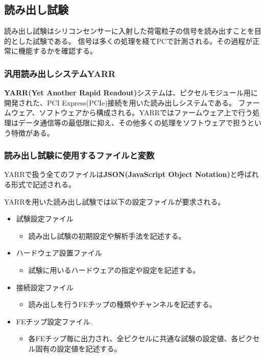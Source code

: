 \clearpage
\subsection{読み出し試験}
読み出し試験はシリコンセンサーに入射した荷電粒子の信号を読み出すことを目的とした試験である。
信号は多くの処理を経てPCで計測される。その過程が正常に機能するかを確認する。

\subsubsection{汎用読み出しシステムYARR}
\textbf{YARR(Yet Another Rapid Readout)}システム\cite{3-3}は、ピクセルモジュール用に開発された、PCI Express(PCIe)接続を用いた読み出しシステムである。
ファームウェア、ソフトウェアから構成される。YARRではファームウェア上で行う処理はデータ通信等の最低限に抑え、その他多くの処理をソフトウェアで担うという特徴がある。

\subsubsection{読み出し試験に使用するファイルと変数}
YARRで扱う全てのファイルは\textbf{JSON(JavaScript Object Notation)}と呼ばれる形式で記述される。

YARRを用いた読み出し試験では以下の設定ファイルが要求される。
\begin{itemize}
  \item 試験設定ファイル
  \begin{itemize}
    \item 読み出し試験の初期設定や解析手法を記述する。
  \end{itemize}
  \item ハードウェア設置ファイル
  \begin{itemize}
    \item 試験に用いるハードウェアの指定や設定を記述する。
  \end{itemize}
  \item 接続設定ファイル
  \begin{itemize}
    \item 読み出しを行うFEチップの種類やチャンネルを記述する。
  \end{itemize}  
  \item FEチップ設定ファイル.
  \begin{itemize}
    \item 各FEチップ毎に出力され、全ピクセルに共通な試験の設定値、各ピクセル固有の設定値を記述する。
  \end{itemize}  
\end{itemize}

